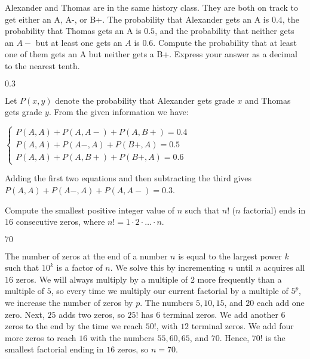\documentclass[11pt]{article}
\begin{document}
\begin{problem}
Alexander and Thomas are in the same history class. They are both on track to get either an A, A-, or B+. The probability that Alexander gets an A is $0.4$, the probability that Thomas gets an A is $0.5$, and the probability that neither gets an $A-$ but at least one gets an $A$ is $0.6$. Compute the probability that at least one of them gets an A but neither gets a B+. Express your answer as a decimal to the nearest tenth.
\end{problem}

\begin{answer}
$\boxed{0.3}$
\end{answer}

\begin{solution}
Let $P(x, y)$ denote the probability that Alexander gets grade $x$ and Thomas gets grade $y$. From the given information we have: \begin{center}$\begin{cases} P(A, A) + P(A, A-) + P(A, B+) = 0.4 \\ P(A, A) + P(A-, A) + P(B+, A) = 0.5 \\ P(A, A) + P(A, B+) + P(B+, A) = 0.6\end{cases}$\end{center} Adding the first two equations and then subtracting the third gives $P(A, A) + P(A-, A) + P(A, A-) = \boxed{0.3}$.
\end{solution}


\begin{problem}%
Compute the smallest positive integer value of $n$ such that $n!$ ($n$ factorial) ends in $16$ consecutive zeros, where $n! = 1 \cdot 2 \cdot \ldots \cdot n$.
\end{problem}

\begin{answer}
$\boxed{70}$
\end{answer}

\begin{solution}
The number of zeros at the end of a number $n$ is equal to the largest power $k$ such that $10^k$ is a factor of $n$. We solve this by incrementing $n$ until $n$ acquires all $16$ zeros. We will always multiply by a multiple of $2$ more frequently than a multiple of $5$, so every time we multiply our current factorial by a multiple of $5^p$, we increase the number of zeros by $p$. The numbers $5, 10, 15$, and $20$ each add one zero. Next, $25$ adds two zeros, so $25!$ has 6 terminal zeros. We add another $6$ zeros to the end by the time we reach $50!$, with $12$ terminal zeros. We add four more zeros to reach $16$ with the numbers $55, 60, 65$, and $70$. Hence, $70!$ is the smallest factorial ending in $16$ zeros, so $n = \boxed{70}$.
\end{solution}
\end{document}
